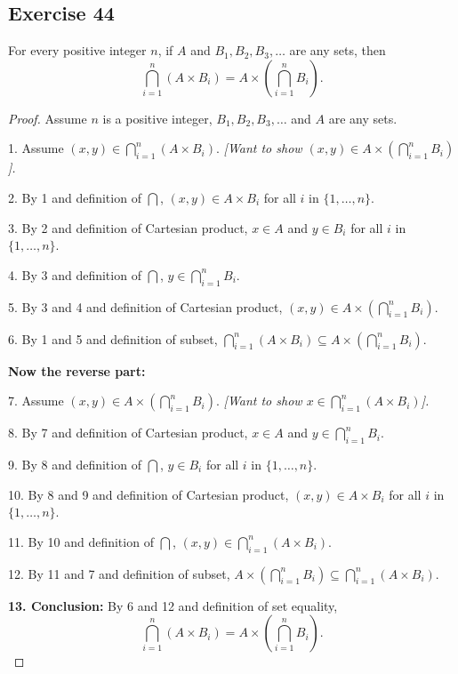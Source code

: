 \documentclass[14pt]{extarticle}
\newcommand{\dps}{\displaystyle}
\begin{document}
\subsection{Exercise 44}
For every positive integer $n$, if $A$ and \(B_1, B_2, B_3, \ldots\) are any sets, then
\[
  \bigcap_{i=1}^n (A \times B_i) = A \times \left( \bigcap_{i=1}^n B_i\right).
\]
\begin{proof}
  Assume $n$ is a positive integer, \(B_1, B_2, B_3, \ldots\) and $A$ are any sets.

  1. Assume \(\dps (x,y) \in \bigcap_{i=1}^n (A \times B_i)\).
    {\it [Want to show \(\dps (x,y) \in A \times \left(\bigcap _{i=1}^n B_i\right)\)].}

  2. By 1 and definition of \(\dps \bigcap\), \((x,y) \in A \times B_i\) for all $i$ in \(\{1, \ldots, n\}\).

  3. By 2 and definition of Cartesian product, \(x \in A\) and \(y \in B_i\) for all $i$ in \(\{1, \ldots, n\}\).

  4. By 3 and definition of $\dps \bigcap$, \(\dps y \in \bigcap_{i=1}^n B_i\).

  5. By 3 and 4 and definition of Cartesian product, \(\dps (x, y) \in A \times \left(\bigcap_{i=1}^n B_i\right)\).

  6. By 1 and 5 and definition of subset, \(\dps \bigcap _{i=1}^n (A \times B_i) \subseteq A \times \left(
  \bigcap _{i=1}^n B_i\right).\)

  {\bf Now the reverse part:}

  7. Assume \(\dps (x,y) \in A \times \left( \bigcap_{i=1}^n B_i\right)\). {\it [Want to show \(\dps x \in \bigcap _{i=1}^n (A \times B_i)\)].}

  8. By 7 and definition of Cartesian product, \(x \in A\) and \(\dps y \in \bigcap_{i=1}^n B_i\).

  9. By 8 and definition of $\dps \bigcap$, \(y \in B_i\) for all $i$ in \(\{1, \ldots, n\}\).

  10. By 8 and 9 and definition of Cartesian product, \((x,y) \in A \times B_i\) for all $i$ in \(\{1, \ldots, n\}\).

  11. By 10 and definition of $\dps \bigcap$, \((x,y) \in \dps \bigcap_{i=1}^n (A \times B_i)\).

  12. By 11 and 7 and definition of subset, \(\dps A \times \left(\bigcap_{i=1}^n B_i\right) \subseteq \bigcap_{i=1}^n
  (A \times B_i)\).

    {\bf 13. Conclusion:} By 6 and 12 and definition of set equality,
  \[
    \bigcap_{i=1}^n (A \times B_i) = A \times \left( \bigcap_{i=1}^n B_i\right).
  \]
\end{proof}
\end{document}

